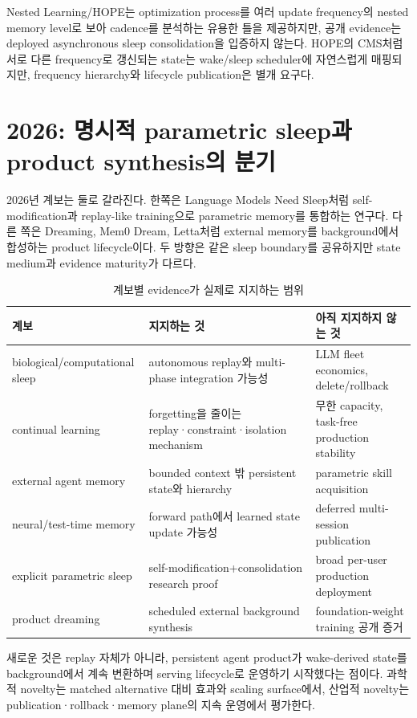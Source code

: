 Nested Learning/HOPE는 optimization process를 여러 update frequency의 nested memory level로 보아
cadence를 분석하는 유용한 틀을 제공하지만, 공개 evidence는 deployed asynchronous sleep consolidation을
입증하지 않는다. \parencite{srcstc0020} HOPE의 CMS처럼 서로 다른 frequency로 갱신되는
state는 wake/sleep scheduler에 자연스럽게 매핑되지만, frequency hierarchy와 lifecycle publication은
별개 요구다.

\section{2026: 명시적 parametric sleep과 product synthesis의 분기}

2026년 계보는 둘로 갈라진다. 한쪽은 Language Models Need Sleep처럼 self-modification과 replay-like
training으로 parametric memory를 통합하는 연구다. 다른 쪽은 Dreaming, Mem0 Dream, Letta처럼 external
memory를 background에서 합성하는 product lifecycle이다. 두 방향은 같은 sleep boundary를 공유하지만
state medium과 evidence maturity가 다르다.

\begin{table}[htbp]
\centering
\caption{계보별 evidence가 실제로 지지하는 범위}
\label{tab:lineage-boundaries}
\small
\begin{tabularx}{\textwidth}{p{} X X}
\toprule
계보 & 지지하는 것 & 아직 지지하지 않는 것 \\
\midrule
biological/computational sleep & autonomous replay와 multi-phase integration 가능성 & LLM fleet economics, delete/rollback \\
continual learning & forgetting을 줄이는 replay·constraint·isolation mechanism & 무한 capacity, task-free production stability \\
external agent memory & bounded context 밖 persistent state와 hierarchy & parametric skill acquisition \\
neural/test-time memory & forward path에서 learned state update 가능성 & deferred multi-session publication \\
explicit parametric sleep & self-modification+consolidation research proof & broad per-user production deployment \\
product dreaming & scheduled external background synthesis & foundation-weight training 공개 증거 \\
\bottomrule
\end{tabularx}
\end{table}

\begin{keypoint}[계보의 종합]
새로운 것은 replay 자체가 아니라, persistent agent product가 wake-derived state를 background에서 계속
변환하며 serving lifecycle로 운영하기 시작했다는 점이다. 과학적 novelty는 matched alternative 대비
효과와 scaling surface에서, 산업적 novelty는 publication·rollback·memory plane의 지속 운영에서 평가한다.
\end{keypoint}
